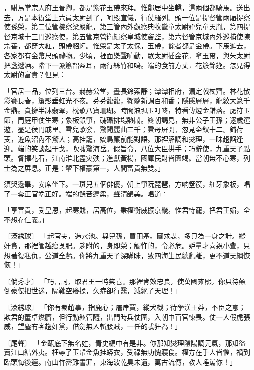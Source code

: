 ，駙馬掌宗人府王晉卿，都是紫花玉帶來拜。惟鄭居中坐轎，這兩個都騎馬。送出去，方是本衙堂上六員太尉到了，呵殿宣儀，行仗羅列。頭一位是提督管兩廂捉察使孫榮，第二位管機察梁應龍，第三管內外觀察典牧畿童太尉姪兒童天胤，第四提督京城十三門巡察使，第五管京營衛緝察皇城使竇監，第六督管京城內外巡捕使陳宗善，都穿大紅，頭帶貂蟬。惟榮是太子太保，玉帶，餘者都是金帶。下馬進去，各家都有金幣尺頭禮物。少頃，裡面樂聲响動，眾太尉插金花，拿玉帶，與朱太尉把盞遞酒。階下一派簫韶盈耳，兩行絲竹和鳴。端的食前方丈，花簇錦筵。怎見得太尉的富貴？但見：

「官居一品，位列三台。赫赫公堂，晝長鈴索靜；潭潭相府，漏定戟杖齊。林花散彩賽長春，簾影垂虹光不夜。芬芬馥馥，獺髓新調百和香；隱隱層層，龍紋大篆千金鼎。貪擁半牀翡翠，枕歌八寶珊瑚。時間浪珮玉叮咚，特看傳燈金錯落。虎符玉節，門庭甲仗生寒；象板銀箏，磈礧排場熱鬧。終朝謁見，無非公子王孫；逐歲逭遊，盡是侯門戚里。雪兒歌發，驚聞麗曲三千；雲母屏開，忽見金釵十二。鋪荷芰，遊魚沼內不驚人；高挂籠，嬌鳥簾前能對語。那裡解調和爕理，一昧趨諂逢迎。端的笑談起干戈，吹噓驚海岳。假旨令，八位大臣拱手；巧辭使，九重天子點頭。督擇花石，江南淮北盡灾殃；進獻黃楊，國庫民財皆匱竭。當朝無不心寒，列士為之屏息。正是：輦下權豪第一，人間富貴無雙。」

須臾遞畢，安席坐下。一斑兒五個俳優，朝上箏阮琵琶，方响箜篌，紅牙象板，唱了一套正官端正好。端的餘音遶梁，聲清韻美。唱道：

「享富貴，受皇恩，起寒賤，居高位，秉權衡威振京畿。惟君恃寵，把君王媚，全不想存仁義。」

〔滾綉球〕  「起官夫，造水池。與兒孫，買田基。圖求謀，多只為一身之計。縱奸貪，那裡管越瘦吳肥。趨附的，身即榮；觸忤的，令必危。妒量才喜親小輩，只想著復私仇，公道全虧。你將九重天子深瞞眛，致四海生民總亂離，更不道天綱恢恢！」

〔倘秀才〕  「巧言詞，取君王一時笑喜。那裡肯效忠良，使萬國雍熙。你只待顛倒豪傑把世迷，隔靴空癢揉，久症卻行醫，減絕了天理！」

〔滾綉球〕  「你有秦趙事，指鹿心；屠岸賈，縱犬機；待學漢王莽，不臣之意；欺君的董卓燃臍，但行動絃管隨，出門時兵仗圍，入朝中百官悚畏。仗一人假虎張威，望塵有客趨奸黨，借劍無人斬腰賊，一任的忒狂為！」

〔尾聲〕  「金甌底下無名姓，青史編中有是非。你那知爕理陰陽調元氣，那知盜賣江山結外夷。枉辱了玉帶金魚挂蟒衣，受祿無功愧寢食。權方在手人皆懼，禍到臨頭悔後遲。南山竹罄難書罪，東海波乾臭未遺，萬古流傳，教人唾罵你！」

